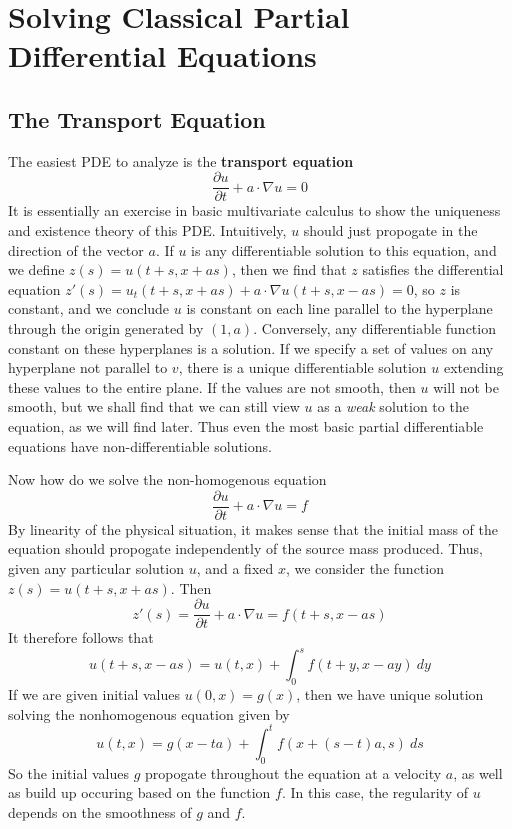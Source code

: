 \chapter{Solving Classical Partial Differential Equations}

\section{The Transport Equation}

The easiest PDE to analyze is the {\bf transport equation}
%
\[ \frac{\partial u}{\partial t} + a \cdot \nabla u = 0 \]
%
It is essentially an exercise in basic multivariate calculus to show the uniqueness and existence theory of this PDE. Intuitively, $u$ should just propogate in the direction of the vector $a$. If $u$ is any differentiable solution to this equation, and we define $z(s) = u(t+s, x + as)$, then we find that $z$ satisfies the differential equation $z'(s) = u_t(t+s,x + as) + a \cdot \nabla u(t+s, x - as) = 0$, so $z$ is constant, and we conclude $u$ is constant on each line parallel to the hyperplane through the origin generated by $(1,a)$. Conversely, any differentiable function constant on these hyperplanes is a solution. If we specify a set of values on any hyperplane not parallel to $v$, there is a unique differentiable solution $u$ extending these values to the entire plane. If the values are not smooth, then $u$ will not be smooth, but we shall find that we can still view $u$ as a {\it weak} solution to the equation, as we will find later. Thus even the most basic partial differentiable equations have non-differentiable solutions.

Now how do we solve the non-homogenous equation
%
\[ \frac{\partial u}{\partial t} + a \cdot \nabla u = f \]
%
By linearity of the physical situation, it makes sense that the initial mass of the equation should propogate independently of the source mass produced. Thus, given any particular solution $u$, and a fixed $x$, we consider the function $z(s) = u(t+s, x + as)$. Then
%
\[ z'(s) = \frac{\partial u}{\partial t} + a \cdot \nabla u = f(t + s, x - as) \]
%
It therefore follows that
%
\[ u(t + s, x - as) = u(t,x) + \int_0^s f(t+y,x-ay)\ dy \]
%
If we are given initial values $u(0,x) = g(x)$, then we have unique solution solving the nonhomogenous equation given by
%
\[ u(t,x) = g(x-ta) + \int_0^t f(x + (s-t)a,s)\ ds \]
%
So the initial values $g$ propogate throughout the equation at a velocity $a$, as well as build up occuring based on the function $f$. In this case, the regularity of $u$ depends on the smoothness of $g$ and $f$.

